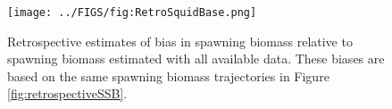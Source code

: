 
\begin{figure}[!tbh]
	\begin{center}
		\texttt{[image: ../FIGS/fig:RetroSquidBase.png]}
	\end{center}
	\caption{Retrospective estimates of bias in spawning biomass relative to spawning biomass estimated with all available data.  These biases are based on the same spawning biomass trajectories in Figure \ref{fig:retrospectiveSSB}.}
	\label{fig:retrosquidbase}
\end{figure}





